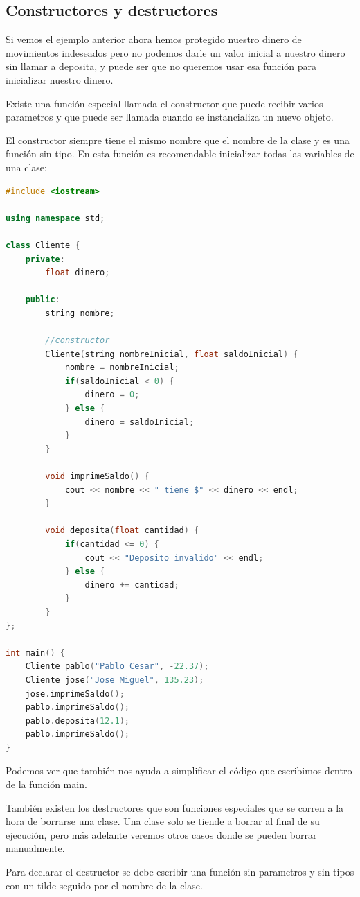\documentclass{article}
\begin{document}
\subsection{Constructores y destructores}

Si vemos el ejemplo anterior ahora hemos protegido nuestro dinero de movimientos indeseados pero no podemos darle un valor inicial a nuestro dinero sin llamar a deposita, y puede ser que no queremos usar esa función para inicializar nuestro dinero.

Existe una función especial llamada el constructor que puede recibir varios parametros y que puede ser llamada cuando se instancializa un nuevo objeto.

El constructor siempre tiene el mismo nombre que el nombre de la clase y es una función sin tipo. En esta función es recomendable inicializar todas las variables de una clase:

\begin{lstlisting}[language=C++, title=Constructores]
#include <iostream>

using namespace std;

class Cliente {
	private:
		float dinero;

	public:
		string nombre;

		//constructor
		Cliente(string nombreInicial, float saldoInicial) {
			nombre = nombreInicial;
			if(saldoInicial < 0) {
				dinero = 0;
			} else {
				dinero = saldoInicial;
			}
		}

		void imprimeSaldo() {
			cout << nombre << " tiene $" << dinero << endl;
		}

		void deposita(float cantidad) {
			if(cantidad <= 0) {
				cout << "Deposito invalido" << endl;
			} else {
				dinero += cantidad;
			}
		}
};

int main() {
	Cliente pablo("Pablo Cesar", -22.37);
	Cliente jose("Jose Miguel", 135.23);
	jose.imprimeSaldo();
	pablo.imprimeSaldo();
	pablo.deposita(12.1);
	pablo.imprimeSaldo();
}
\end{lstlisting}

Podemos ver que también nos ayuda a simplificar el código que escribimos dentro de la función main.

También existen los destructores que son funciones especiales que se corren a la hora de borrarse una clase. Una clase solo se tiende a borrar al final de su ejecución, pero más adelante veremos otros casos donde se pueden borrar manualmente.

Para declarar el destructor se debe escribir una función sin parametros y sin tipos con un tilde seguido por el nombre de la clase.
\end{document}
